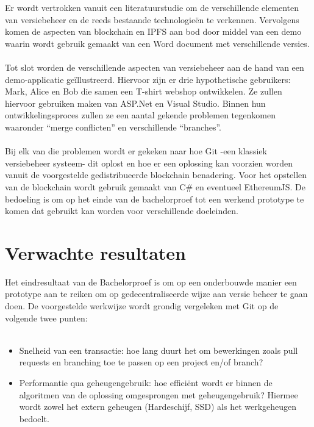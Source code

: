 Er wordt vertrokken vanuit een literatuurstudie om de verschillende elementen van versiebeheer en de reeds bestaande technologieën te verkennen. Vervolgens komen de aspecten van blockchain en IPFS aan bod door middel van een demo waarin wordt gebruik gemaakt van een Word document met verschillende versies.\\\\
Tot slot worden de verschillende aspecten van versiebeheer aan de hand van een demo-applicatie geïllustreerd. Hiervoor zijn er drie hypothetische gebruikers: Mark, Alice en Bob die samen een T-shirt webshop ontwikkelen. Ze zullen hiervoor gebruiken maken van ASP.Net en Visual Studio. Binnen hun ontwikkelingsproces zullen ze een aantal gekende problemen tegenkomen waaronder “merge conflicten” en verschillende “branches”.\\\\
Bij elk van die problemen wordt er gekeken naar hoe Git -een klassiek versiebeheer systeem- dit oplost en hoe er een oplossing kan voorzien worden vanuit de voorgestelde gedistribueerde blockchain benadering. Voor het opstellen van de blockchain wordt gebruik gemaakt van C\# en eventueel EthereumJS. De bedoeling is om op het einde van de bachelorproef tot een werkend prototype te komen dat gebruikt kan worden voor verschillende doeleinden.

\section{Verwachte resultaten}
\label{sec:verwachte_resultaten}

Het eindresultaat van de Bachelorproef is om op een onderbouwde manier een prototype aan te reiken om op gedecentraliseerde wijze aan versie beheer te gaan doen. De voorgestelde werkwijze wordt grondig vergeleken met Git op de volgende twee punten:\\\\

\begin{itemize}
\item Snelheid van een transactie: hoe lang duurt het om bewerkingen zoals pull requests en branching toe te passen op een project en/of branch?
\item Performantie qua geheugengebruik: hoe efficiënt wordt er binnen de algoritmen van de oplossing omgesprongen met geheugengebruik? Hiermee wordt zowel het extern geheugen (Hardeschijf, SSD) als het werkgeheugen bedoelt.\\\\
\end{itemize}

